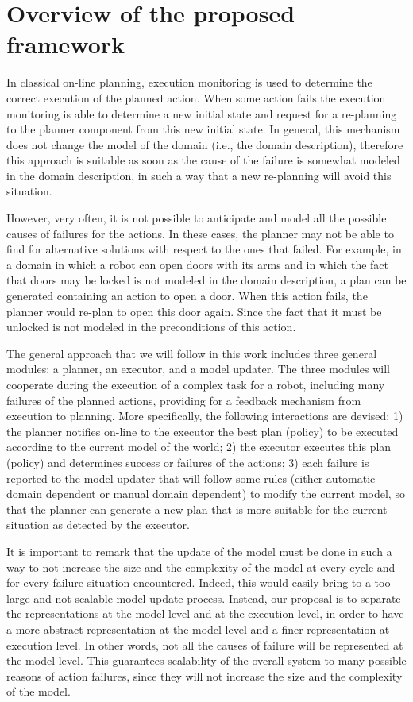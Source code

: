 \section{Overview of the proposed framework}

In classical on-line planning, execution monitoring is used to determine the correct execution of the planned action. When some action fails the execution monitoring is able to determine a new initial state and request for a re-planning to the planner component from this new initial state.
In general, this mechanism does not change the model of the domain (i.e., the domain description), therefore this approach is suitable as soon as the cause of the failure is somewhat modeled in the domain description, in such a way that a new re-planning will avoid this situation.

However, very often, it is not possible to anticipate and model all the possible causes of failures for the actions. In these cases, the planner may not be able to find for alternative solutions with respect to the ones that failed. For example, in a domain in which a robot can open doors with its arms and in which the fact that doors may be locked is not modeled in the domain description, a plan can be generated containing an action to open a door. When this action fails, the planner would re-plan to open this door again. Since the fact that it must be unlocked is not modeled in the preconditions of this action.


The general approach that we will follow in this work includes three general modules: a planner, an executor, and a model updater. The three modules will cooperate during the execution of a complex task for a robot, including many failures of the planned actions, providing for a feedback mechanism from execution to planning.
More specifically, the following interactions are devised:
1) the planner notifies on-line to the executor the best plan (policy) to be executed according to the current model of the world; 2) the executor executes this plan (policy) and determines success or failures of the actions; 3) each failure is reported to the model updater that will follow some rules (either automatic domain dependent or manual domain dependent) to modify the current model, so that the planner can generate a new plan that is more suitable for the current situation as detected by the executor.

It is important to remark that the update of the model must be done in such a way to not increase the size and the complexity of the model at every cycle and for every failure situation encountered. Indeed, this would easily bring to a too large and not scalable model update process. Instead, our proposal is to separate the representations at the model level and at the execution level, in order to have a more abstract representation at the model level and a finer representation at execution level.
In other words, not all the causes of failure will be represented at the model level. This guarantees scalability of the overall system to many possible reasons of action failures,
since they will not increase the size and the complexity of the model.


